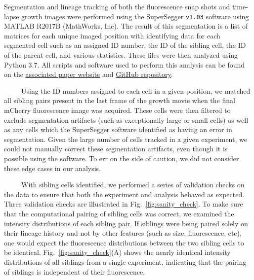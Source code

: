 \documentclass[12pt]{caltech_thesis}
\begin{document}
Segmentation and lineage tracking of both the fluorescence snap shots
and time-lapse growth images were performed using the SuperSegger
\texttt{v1.03} \autocite{stylianidou2016} software using MATLAB R2017B
(MathWorks, Inc). The result of this segmentation is a list of matrices
for each unique imaged position with identifying data for each segmented
cell such as an assigned ID number, the ID of the sibling cell, the ID
of the parent cell, and various statistics. These files were then
analyzed using Python 3.7. All scripts and software used to perform this
analysis can be found on the
\href{https://www.rpgroup.caltech.edu/mwc_growth}{associated paper
website} and \href{https://github.com/rpgroup-pboc/mwc_growth}{GitHub
repository}.

~~~~~Using the ID numbers assigned to each cell in a given position, we
matched all sibling pairs present in the last frame of the growth movie
when the final mCherry fluorescence image was acquired. These cells were
then filtered to exclude segmentation artifacts (such as exceptionally
large or small cells) as well as any cells which the SuperSegger
software identified as having an error in segmentation. Given the large
number of cells tracked in a given experiment, we could not manually
correct these segmentation artifacts, even though it is possible using
the software. To err on the side of caution, we did not consider these
edge cases in our analysis.

~~~~~With sibling cells identified, we performed a series of validation
checks on the data to ensure that both the experiment and analysis
behaved as expected. Three validation checks are illustrated in
Fig.~\ref{fig:sanity_check}. To make sure that the computational pairing
of sibling cells was correct, we examined the intensity distributions of
each sibling pair. If siblings were being paired solely on their lineage
history and not by other features (such as size, fluorescence, etc), one
would expect the fluorescence distributions between the two sibling
cells to be identical. Fig.~\ref{fig:sanity_check}(A) shows the nearly
identical intensity distributions of all siblings from a single
experiment, indicating that the pairing of siblings is independent of
their fluorescence.
\end{document}
